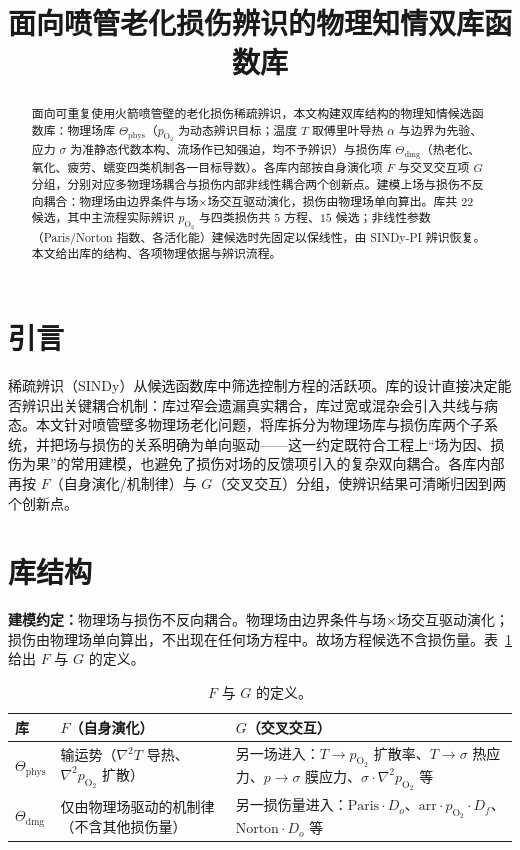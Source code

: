 \documentclass[11pt,a4paper]{article}
\title{\bfseries 面向喷管老化损伤辨识的物理知情双库函数库}
\date{}
\begin{document}
\maketitle

\begin{abstract}
\noindent 面向可重复使用火箭喷管壁的老化损伤稀疏辨识，本文构建双库结构的物理知情候选函数库：物理场库 $\Theta_{\mathrm{phys}}$（$p_{\mathrm{O}_2}$ 为动态辨识目标；温度 $T$ 取傅里叶导热 $\alpha$ 与边界为先验、应力 $\sigma$ 为准静态代数本构、流场作已知强迫，均不予辨识）与损伤库 $\Theta_{\mathrm{dmg}}$（热老化、氧化、疲劳、蠕变四类机制各一目标导数）。各库内部按自身演化项 $F$ 与交叉交互项 $G$ 分组，分别对应多物理场耦合与损伤内部非线性耦合两个创新点。建模上场与损伤不反向耦合：物理场由边界条件与场×场交互驱动演化，损伤由物理场单向算出。库共 $22$ 候选，其中主流程实际辨识 $p_{\mathrm{O}_2}$ 与四类损伤共 $5$ 方程、$15$ 候选；非线性参数（Paris/Norton 指数、各活化能）建候选时先固定以保线性，由 SINDy-PI 辨识恢复。本文给出库的结构、各项物理依据与辨识流程。
\end{abstract}

\section{引言}
稀疏辨识（SINDy）从候选函数库中筛选控制方程的活跃项。库的设计直接决定能否辨识出关键耦合机制：库过窄会遗漏真实耦合，库过宽或混杂会引入共线与病态。本文针对喷管壁多物理场老化问题，将库拆分为物理场库与损伤库两个子系统，并把场与损伤的关系明确为单向驱动——这一约定既符合工程上“场为因、损伤为果”的常用建模，也避免了损伤对场的反馈项引入的复杂双向耦合。各库内部再按 $F$（自身演化/机制律）与 $G$（交叉交互）分组，使辨识结果可清晰归因到两个创新点。

\section{库结构}
\textbf{建模约定：}物理场与损伤不反向耦合。物理场由边界条件与场×场交互驱动演化；损伤由物理场单向算出，不出现在任何场方程中。故场方程候选不含损伤量。表~\ref{tab:fg} 给出 $F$ 与 $G$ 的定义。

\begin{table}[h]\centering\small
\caption{$F$ 与 $G$ 的定义。}
\label{tab:fg}
\begin{tabular}{>{\raggedright\arraybackslash}p{2.2cm} >{\raggedright\arraybackslash}p{4.8cm} >{\raggedright\arraybackslash}p{7cm}}
\toprule
库 & $F$（自身演化） & $G$（交叉交互） \\
\midrule
$\Theta_{\mathrm{phys}}$ & 输运势（$\nabla^2 T$ 导热、$\nabla^2 p_{\mathrm{O}_2}$ 扩散） & 另一场进入：$T\to p_{\mathrm{O}_2}$ 扩散率、$T\to\sigma$ 热应力、$p\to\sigma$ 膜应力、$\sigma\!\cdot\!\nabla^2 p_{\mathrm{O}_2}$ 等 \\
$\Theta_{\mathrm{dmg}}$ & 仅由物理场驱动的机制律（不含其他损伤量） & 另一损伤量进入：$\mathrm{Paris}\cdot D_o$、$\mathrm{arr}\cdot p_{\mathrm{O}_2}\cdot D_f$、$\mathrm{Norton}\cdot D_o$ 等 \\
\bottomrule
\end{tabular}
\end{table}
\end{document}

